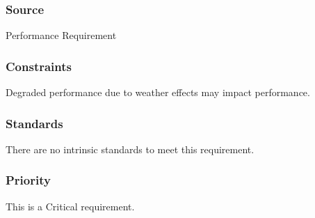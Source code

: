 \subsubsection{Source}
Performance Requirement
\subsubsection{Constraints}
Degraded performance due to weather effects may impact performance.
\subsubsection{Standards}
There are no intrinsic standards to meet this requirement.
\subsubsection{Priority}
This is a Critical requirement.